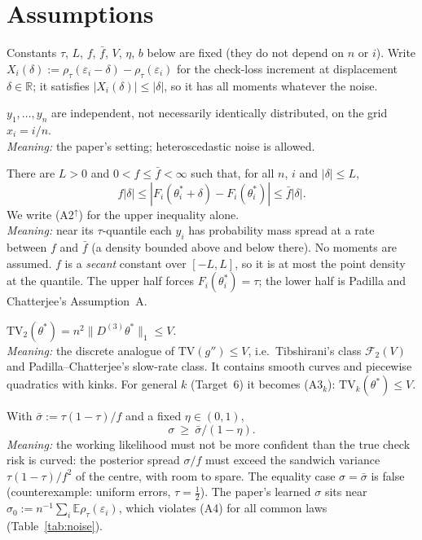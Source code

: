 \documentclass[11pt]{article}
\newcommand{\R}{\mathbb{R}}
\newcommand{\E}{\mathbb{E}}
\newcommand{\norm}[1]{\lVert #1\rVert}
\newcommand{\Dthree}{D^{(3)}}
\newcommand{\TV}{\mathrm{TV}}
\newcommand{\sbar}{\bar\sigma}
\theoremstyle{plain}
\theoremstyle{definition}
\theoremstyle{remark}
\begin{document}
\section{Assumptions}
\label{sec:assumptions}

Constants $\tau$, $L$, $f$, $\bar f$, $V$, $\eta$, $b$ below are fixed (they do not depend on $n$ or $i$). Write $X_i(\delta) := \rho_\tau(\varepsilon_i-\delta)-\rho_\tau(\varepsilon_i)$ for the check-loss increment at displacement $\delta\in\R$; it satisfies $|X_i(\delta)|\le|\delta|$, so it has all moments whatever the noise.

\begin{description}[leftmargin=0pt, itemsep=5pt]
\item[(A1) Independence.] $y_1,\dots,y_n$ are independent, not necessarily identically distributed, on the grid $x_i=i/n$.\\
\textit{Meaning:} the paper's setting; heteroscedastic noise is allowed.

\item[(A2) Two-sided margin.] There are $L>0$ and $0<f\le\bar f<\infty$ such that, for all $n$, $i$ and $|\delta|\le L$,
\[
f|\delta| \le |F_i(\theta^*_i+\delta)-F_i(\theta^*_i)| \le \bar f|\delta| .
\]
We write (A2$^{\uparrow}$) for the upper inequality alone.\\
\textit{Meaning:} near its $\tau$-quantile each $y_i$ has probability mass spread at a rate between $f$ and $\bar f$ (a density bounded above and below there). No moments are assumed. $f$ is a \emph{secant} constant over $[-L,L]$, so it is at most the point density at the quantile. The upper half forces $F_i(\theta^*_i)=\tau$; the lower half is Padilla and Chatterjee's Assumption~A.

\item[(A3) Bounded variation of the second derivative ($k=2$).] $\TV_2(\theta^*) = n^2\norm{\Dthree\theta^*}_1\le V$.\\
\textit{Meaning:} the discrete analogue of $\TV(g'')\le V$, i.e.\ Tibshirani's class $\mathcal F_2(V)$ and Padilla--Chatterjee's slow-rate class. It contains smooth curves and piecewise quadratics with kinks. For general $k$ (Target~6) it becomes (A3$_k$): $\TV_k(\theta^*)\le V$.

\item[(A4) Strict $\sigma$ slack.] With $\sbar := \tau(1-\tau)/f$ and a fixed $\eta\in(0,1)$,
\[
\sigma \ \ge\ \sbar/(1-\eta).
\]
\textit{Meaning:} the working likelihood must not be more confident than the true check risk is curved: the posterior spread $\sigma/f$ must exceed the sandwich variance $\tau(1-\tau)/f^2$ of the centre, with room to spare. The equality case $\sigma=\sbar$ is false (counterexample: uniform errors, $\tau=\tfrac12$). The paper's learned $\sigma$ sits near $\sigma_0:=n^{-1}\sum_i\E\rho_\tau(\varepsilon_i)$, which violates (A4) for all common laws (Table~\ref{tab:noise}).


\end{description}
\end{document}
